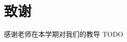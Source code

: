 \documentclass[10pt, conference, compsocconf, a4paper]{IEEEtran}
\begin{document}
\section{致谢}
感谢老师在本学期对我们的教导 TODO













 
   



\end{document}
